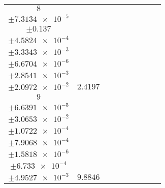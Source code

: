 \documentclass[8pt]{article}
\begin{document}
\begin{longtable}[l]{c c c c c c c c c}
$\num{8}$ & \begin{tabular}[c]{@{}c@{}}$\num{3.0547e-2}$ \\ $\pm\num{7.3134e-5}$\end{tabular} & \begin{tabular}[c]{@{}c@{}}$\num{7.689e-2}$ \\ $\pm\num{0.137}$\end{tabular} & \begin{tabular}[c]{@{}c@{}}$\num{9.0992}$ \\ $\pm\num{4.5824e-4}$\end{tabular} & \begin{tabular}[c]{@{}c@{}}$\num{1.8667e+3}$ \\ $\pm\num{3.3343e-3}$\end{tabular} & \begin{tabular}[c]{@{}c@{}}$\num{3.7344}$ \\ $\pm\num{6.6704e-6}$\end{tabular} & \begin{tabular}[c]{@{}c@{}}$\num{1.1563}$ \\ $\pm\num{2.8541e-3}$\end{tabular} & \begin{tabular}[c]{@{}c@{}}$\num{4.2221}$ \\ $\pm\num{2.0972e-2}$\end{tabular} & $\num{2.4197}$\\
$\num{9}$ & \begin{tabular}[c]{@{}c@{}}$\num{0.12445}$ \\ $\pm\num{6.6391e-5}$\end{tabular} & \begin{tabular}[c]{@{}c@{}}$\num{-7.9889e-2}$ \\ $\pm\num{3.0653e-2}$\end{tabular} & \begin{tabular}[c]{@{}c@{}}$\num{-5.2047}$ \\ $\pm\num{1.0722e-4}$\end{tabular} & \begin{tabular}[c]{@{}c@{}}$\num{1.9243e+3}$ \\ $\pm\num{7.9068e-4}$\end{tabular} & \begin{tabular}[c]{@{}c@{}}$\num{3.8496}$ \\ $\pm\num{1.5818e-6}$\end{tabular} & \begin{tabular}[c]{@{}c@{}}$\num{1.1798}$ \\ $\pm\num{6.733e-4}$\end{tabular} & \begin{tabular}[c]{@{}c@{}}$\num{4.2369}$ \\ $\pm\num{4.9527e-3}$\end{tabular} & $\num{9.8846}$\\

\end{longtable}
\end{document}
